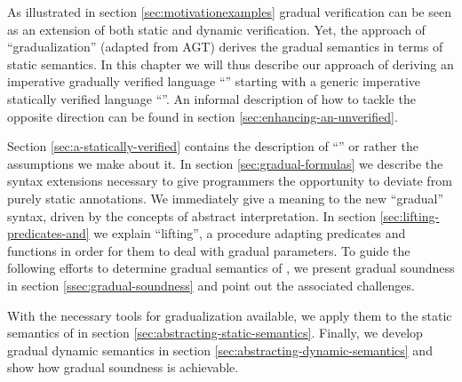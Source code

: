 As illustrated in section \ref{sec:motivationexamples} gradual verification can be seen as an extension of both static and dynamic verification.
Yet, the approach of “gradualization” (adapted from AGT) derives the gradual semantics in terms of static semantics.
In this chapter we will thus describe our approach of deriving an imperative gradually verified language “{\gvl}” starting with a generic imperative statically verified language “{\svl}”.
An informal description of how to tackle the opposite direction can be found in section \ref{sec:enhancing-an-unverified}.

Section \ref{sec:a-statically-verified} contains the description of “{\svl}” or rather the assumptions we make about it.
In section \ref{sec:gradual-formulas} we describe the syntax extensions necessary to give programmers the opportunity to deviate from purely static annotations.
We immediately give a meaning to the new “gradual” syntax, driven by the concepts of abstract interpretation.
In section \ref{sec:lifting-predicates-and} we explain “lifting”, a procedure adapting predicates and functions in order for them to deal with gradual parameters.
To guide the following efforts to determine gradual semantics of \gvl, we present gradual soundness in section \ref{ssec:gradual-soundness} and point out the associated challenges.

With the necessary tools for gradualization available, we apply them to the static semantics of \svl in section \ref{sec:abstracting-static-semantics}.
Finally, we develop gradual dynamic semantics in section \ref{sec:abstracting-dynamic-semantics} and show how gradual soundness is achievable.

